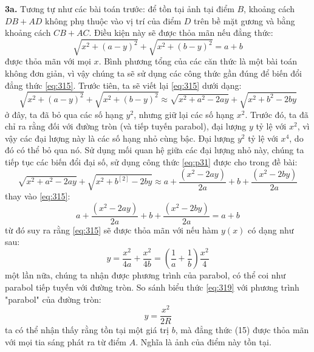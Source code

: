 \noindent\textbf{3a.} Tương tự như các bài toán trước: để tồn tại ảnh tại điểm $B$, khoảng cách $ DB + AD $ không phụ thuộc vào vị trí của điểm $ D $ trên bề mặt gương và bằng khoảng cách $ CB + AC $. Điều kiện này sẽ được thỏa mãn nếu đẳng thức:
\begin{equation}
  \label{eq:315}
  \sqrt{x^{2}+(a-y)^{2}}+\sqrt{x^{2}+(b-y)^{2}}=a+b
\end{equation}
được thỏa mãn với mọi $ x $. Bình phương tổng của các căn thức là một bài toán không đơn giản, vì vậy chúng ta sẽ sử dụng các công thức gần đúng để biến đổi đẳng thức \eqref{eq:315}. Trước tiên, ta sẽ viết lại \eqref{eq:315} dưới dạng:
\begin{equation}
  \label{eq:316}
  \sqrt{x^{2}+(a-y)^{2}}+\sqrt{x^{2}+(b-y)^{2}}\approx \sqrt{x^{2}+a^{2}-2ay}+\sqrt{x^{2}+b^{2}-2by}
\end{equation}
ở đây, ta đã bỏ qua các số hạng $ y^{2} $, nhưng giữ lại các số hạng $ x^{2} $. Trước đó, ta đã chỉ ra rằng đối với đường tròn (và tiếp tuyến parabol), đại lượng $ y $ tỷ lệ với $ x^{2} $, vì vậy các đại lượng này là các số hạng nhỏ cùng bậc. Đại lượng $ y^{2} $ tỷ lệ với $ x^{4} $, do đó có thể bỏ qua nó. Sử dụng mối quan hệ giữa các đại lượng nhỏ này, chúng ta tiếp tục các biến đổi đại số, sử dụng công thức \eqref{eq:p31} được cho trong đề bài:
\begin{equation}
  \label{eq:317}
  \sqrt{x^{2}+a^{2}-2ay}+\sqrt{x^{2}+b^[2]-2by}\approx a+\frac{(x^{2}-2ay)}{2a}+b+\frac{(x^{2}-2by)}{2a}
\end{equation}
thay vào \eqref{eq:315}:
\begin{equation}
  \label{eq:318}
  a+\frac{(x^{2}-2ay)}{2a}+b+\frac{(x^{2}-2by)}{2a}=a+b
\end{equation}
từ đó suy ra rằng \eqref{eq:315} sẽ được thỏa mãn với nếu hàm $ y(x) $ có dạng như sau:
\begin{equation}
  \label{eq:319}
  y=\frac{x^{2}}{4a}+\frac{x^{2}}{4b}=\left(\frac{1}{a}+\frac{1}{b}\right)\frac{x^{2}}{4}
\end{equation}
một lần nữa, chúng ta nhận được phương trình của parabol, có thể coi như parabol tiếp tuyến với đường tròn. So sánh biểu thức \eqref{eq:319} với phương trình "parabol" của đường tròn:
\begin{equation*}
  y = \frac{x^{2}}{2R}
\end{equation*}
ta có thể nhận thấy rằng tồn tại một giá trị $ b $, mà đẳng thức (15) được thỏa mãn với mọi tia sáng phát ra từ điểm $ A $. Nghĩa là ảnh của điểm này tồn tại.\\

